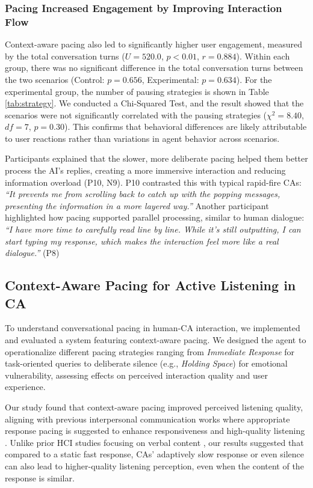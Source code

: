 \subsubsection{Pacing Increased Engagement by Improving Interaction Flow}
Context-aware pacing also led to significantly higher user engagement, measured by the total conversation turns ($U=520.0$, $p<0.01$, $r=0.884$). Within each group, there was no significant difference in the total conversation turns between the two scenarios (Control: $p=0.656$, Experimental: $p=0.634$). 
For the experimental group, the number of pausing strategies is shown in Table \ref{tab:strategy}. We conducted a Chi-Squared Test, and the result showed that the scenarios were not significantly correlated with the pausing strategies ($\chi^2=8.40$, $df=7$, $p=0.30$).
This confirms that behavioral differences are likely attributable to user reactions rather than variations in agent behavior across scenarios.


Participants explained that the slower, more deliberate pacing helped them better process the AI's replies, creating a more immersive interaction and reducing information overload (P10, N9). 
P10 contrasted this with typical rapid-fire CAs: \textit{``It prevents me from scrolling back to catch up with the popping messages, presenting the information in a more layered way.''}
Another participant highlighted how pacing supported parallel processing, similar to human dialogue: \textit{``I have more time to carefully read line by line. While it's still outputting, I can start typing my response, which makes the interaction feel more like a real dialogue.''} (P8)

\subsection{Context-Aware Pacing for Active Listening in CA}

To understand conversational pacing in human-CA interaction, we implemented and evaluated a system featuring context-aware pacing. We designed the agent to operationalize different pacing strategies ranging from \emph{Immediate Response} for task-oriented queries to deliberate silence (e.g., \emph{Holding Space}) for emotional vulnerability, assessing effects on perceived interaction quality and user experience.

Our study found that context-aware pacing improved perceived listening quality, aligning with previous interpersonal communication works where appropriate response pacing is suggested to enhance responsiveness and high-quality listening \cite{templeton2023listening}. 
Unlike prior HCI studies focusing on verbal content \cite{10.1145/3555164, 10.1145/3706598.3714228, johansson2016making, lala-etal-2017-attentive, 10.1145/3313831.3376175, 10.1145/3313831.3376131}, our results suggested that compared to a static fast response, CAs' adaptively slow response or even silence can also lead to higher-quality listening perception, even when the content of the response is similar.

